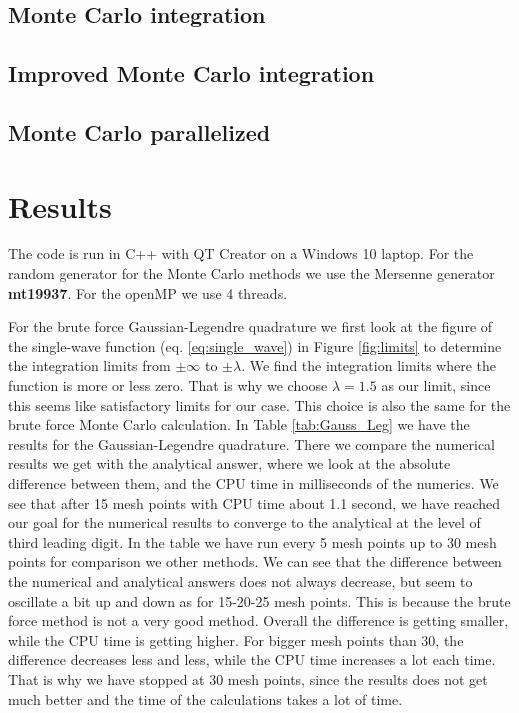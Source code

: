 \documentclass[12pt,a4paper,english]{article}
\begin{document}
\subsection{Monte Carlo integration}
\subsection{Improved Monte Carlo integration}
\subsection{Monte Carlo parallelized}


\section{Results}
The code is run in C++ with QT Creator on a Windows 10 laptop. For the random generator for the Monte Carlo methods we use the Mersenne generator \textbf{mt19937}. For the openMP we use 4 threads.

For the brute force Gaussian-Legendre quadrature we first look at the figure of the single-wave function (eq. \ref{eq:single_wave}) in Figure \ref{fig:limits} to determine the integration limits from $\pm\infty$ to $\pm\lambda$. We find the integration limits where the function is more or less zero. That is why we choose $\lambda=1.5$ as our limit, since this seems like satisfactory limits for our case. This choice is also the same for the brute force Monte Carlo calculation. In Table \ref{tab:Gauss_Leg} we have the results for the Gaussian-Legendre quadrature. There we compare the numerical results we get with the analytical answer, where we look at the absolute difference between them, and the CPU time in milliseconds of the numerics. We see that after 15 mesh points with CPU time about 1.1 second, we have reached our goal for the numerical results to converge to the analytical at the level of third leading digit. In the table we have run every 5 mesh points up to 30 mesh points for comparison we other methods. We can see that the difference between the numerical and analytical answers does not always decrease, but seem to oscillate a bit up and down as for 15-20-25 mesh points. This is because the brute force method is not a very good method. Overall the difference is getting smaller, while the CPU time is getting higher. For bigger mesh points than 30, the difference decreases less and less, while the CPU time increases a lot each time. That is why we have stopped at 30 mesh points, since the results does not get much better and the time of the calculations takes a lot of time. 
\end{document}
